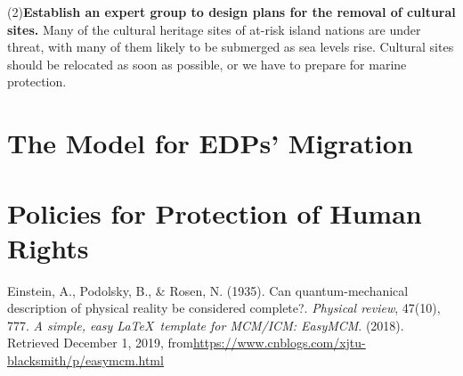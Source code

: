 \documentclass[12pt]{article}  %
\begin{document}
(2)\textbf{Establish an expert group to design plans for the removal of cultural sites.} Many of the cultural heritage sites of at-risk island nations are under threat, with many of them likely to be submerged as sea levels rise. Cultural sites should be relocated as soon as possible, or we have to prepare for marine protection. 



\section{The Model for EDPs’ Migration}

\subsection{}



\subsection{}




\subsection{}





\subsection{}




\section{Policies for Protection of Human Rights}



\begin{thebibliography}{99}
 Einstein, A., Podolsky, B., \& Rosen, N. (1935). Can quantum-mechanical description of physical reality be considered complete?. \emph{Physical review}, 47(10), 777.
 \emph{A simple, easy \LaTeX\ template for MCM/ICM: EasyMCM}. (2018). Retrieved December 1, 2019, from\url{https://www.cnblogs.com/xjtu-blacksmith/p/easymcm.html}
\end{thebibliography}
\end{document}
